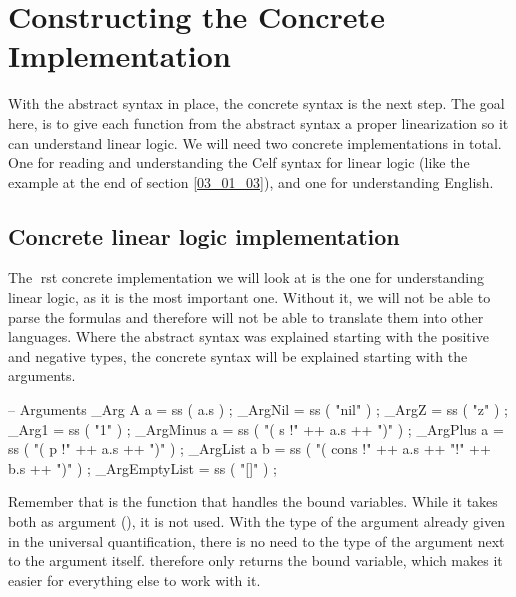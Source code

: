 \section{Constructing the Concrete Implementation}
\label{04_02}

With the abstract syntax in place, the concrete syntax is the next step. The goal here, is to give each function from the abstract syntax a proper linearization so it can understand linear logic. We will need two concrete implementations in total. One for reading and understanding the Celf syntax for linear logic (like the example at the end of section \ref{03_01_03}), and one for understanding English.

\subsection{Concrete linear logic implementation}
\label{04_02_01}

The rst concrete implementation we will look at is the one for understanding linear logic, as it is the most important one. Without it, we will not be able to parse the formulas and therefore will not be able to translate them into other languages. Where the abstract syntax was explained starting with the positive and negative types, the concrete syntax will be explained starting with the arguments.

\begin{lstgf}
        -- Arguments
        _Arg A a                        = ss ( a.s ) ;
        _ArgNil                         = ss ( "nil" ) ;
        _ArgZ                           = ss ( "z" ) ;
        _Arg1                           = ss ( "1" ) ;
        _ArgMinus a                     = ss ( "( s !" ++ a.s ++ ")" ) ;
        _ArgPlus a                      = ss ( "( p !" ++ a.s ++ ")" ) ;
        _ArgList a b                    = ss ( "( cons !" ++ a.s ++ "!" ++ b.s ++ ")" ) ;
        _ArgEmptyList                   = ss ( "[]" ) ;
\end{lstgf}

Remember that  is the function that handles the bound variables. While it takes both as argument (), it is not used. With the type of the argument already given in the universal quantification, there is no need to the type of the argument next to the argument itself.  therefore only returns the bound variable, which makes it easier for everything else to work with it.

